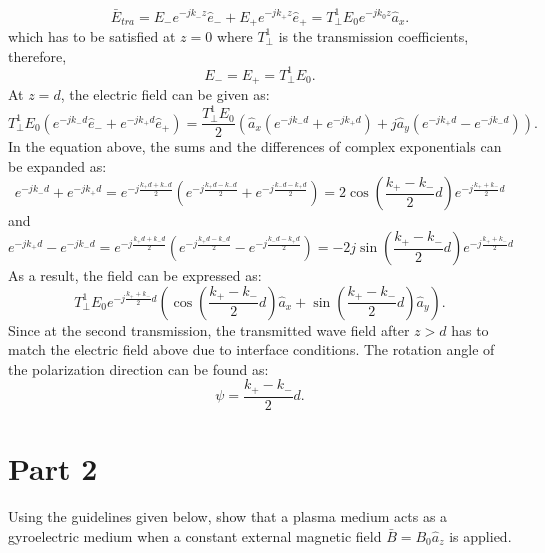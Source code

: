 \documentclass[11pt]{amsart}
\begin{document}
\begin{equation}
\bar{E}_{tra}=E_- e^{-j k_- z} \hat{e}_- + E_+ e^{-j k_+ z} \hat{e}_+ = T_{\bot}^1 E_0 e^{-j k_0 z}\hat{a}_x.
\end{equation}
which has to be satisfied at $z=0$ where $T_{\bot}^1$ is the transmission coefficients, therefore,
\begin{equation}
E_-=E_+= T_{\bot}^1 E_0.
\end{equation}
At $z=d$, the electric field can be given as:
\begin{equation}
T_{\bot}^1 E_0( e^{-j k_- d} \hat{e}_- + e^{-j k_+ d} \hat{e}_+)= \frac{T_{\bot}^1 E_0}{2} (\hat{a}_x(e^{-j k_- d}+e^{-j k_+ d})+j\hat{a}_y (e^{-j k_+ d}- e^{-j k_- d})).
\end{equation}
In the equation above, the sums and the differences of complex exponentials can be expanded as:
\begin{equation}
e^{-j k_- d}+e^{-j k_+ d}=e^{-j \frac{k_+ d+k_- d}{2}}(e^{-j \frac{k_+ d-k_- d}{2}}+e^{-j \frac{k_- d-k_+ d}{2}})=2 \cos (\frac{k_+ -k_- }{2}d)e^{-j \frac{k_+ +k_- }{2}d}
\end{equation}
and 
\begin{equation}
e^{-j k_+ d}-e^{-j k_- d}=e^{-j \frac{k_+ d+k_- d}{2}}(e^{-j \frac{k_+ d-k_- d}{2}}-e^{-j \frac{k_- d-k_+ d}{2}})=-2j \sin (\frac{k_+ -k_- }{2}d)e^{-j \frac{k_+ +k_- }{2}d}
\end{equation}
As a result, the field can be expressed as:
\begin{equation}
 T_{\bot}^1 E_0 e^{-j \frac{k_+ +k_- }{2}d}(\cos (\frac{k_+ -k_- }{2}d) \hat{a}_x+\sin (\frac{k_+ -k_- }{2}d)\hat{a}_y ).
\end{equation}
Since at the second transmission, the transmitted wave field after $z>d$ has to match the electric field above due  to interface conditions. The rotation angle of the polarization direction can be found as:
\begin{equation}
\psi=\frac{k_+ -k_- }{2}d.
\end{equation}
\newpage
\section*{Part 2 }
Using the guidelines given below, show that a plasma medium acts as a gyroelectric
medium when a constant external magnetic field $\bar{B}=B_0 \hat{a}_z$ is applied.
\end{document}
